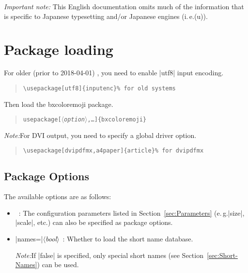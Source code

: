 \documentclass[a4paper]{article}
\newcommand{\Pkg}[1]{\textsf{#1}}
\newcommand{\Meta}[1]{$\langle$\textit{#1}$\rangle$}
\newcommand{\RMeta}[1]{{\rmfamily\Meta{#1}}}
\newcommand{\Note}{\par\noindent\emph{Note:}\quad}
\newcommand{\Means}{~:\quad}
\newcommand{\／}{\mbox{}／\mbox{}}
\newcommand{\cs}[1]{\symbol{`\\}#1}
\newcommand{\Ie}{i.\,e.}
\newcommand{\Eg}{e.\,g.}
\begin{document}
\emph{Important note:}
This English documentation omits much of the information
that is specific to Japanese typesetting
and/or Japanese engines (\Ie {(u)\pLaTeX}).


\section{Package loading}
\label{sec:Loading}

For older (prior to 2018-04-01) {\pdfLaTeX},
you need to enable |utf8| input encoding.

\begin{quote}\small\begin{verbatim}
\usepackage[utf8]{inputenc}% for old systems
\end{verbatim}\end{quote}

Then load the \Pkg{bxcoloremoji} package.

\begin{quote}\small\begin{alltt}
\cs{usepackage}[\RMeta{option},…]\{bxcoloremoji\}
\end{alltt}\end{quote}

\Note For DVI output, you need to specify a global driver option.
\begin{quote}\small\begin{verbatim}
\usepackage[dvipdfmx,a4paper]{article}% for dvipdfmx
\end{verbatim}\end{quote}

\subsection{Package Options}

The available options are as follows:

\begin{itemize}
\item {}\Means
The configuration parameters listed in Section~\ref{sec:Parameters}
(\Eg |size|, |scale|, etc.)
can also be specified as package options.

\item |names=|\Meta{bool}\Means
  Whether to load the short name database.
  \Note If |false| is specified, only special short names
  (see Section~\ref{sec:Short-Names}) can be used.
\end{itemize}
\end{document}
